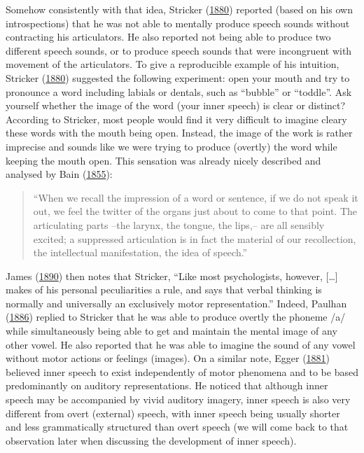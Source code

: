 \documentclass[a4paper,12pt,twoside,onecolumn,openright,final,oldfontcommands]{memoir}
\begin{document}
Somehow consistently with that idea, Stricker (\protect\hyperlink{ref-stricker_studien_1880}{1880}) reported (based on his own introspections) that he was not able to mentally produce speech sounds without contracting his articulators. He also reported not being able to produce two different speech sounds, or to produce speech sounds that were incongruent with movement of the articulators. To give a reproducible example of his intuition, Stricker (\protect\hyperlink{ref-stricker_studien_1880}{1880}) suggested the following experiment: open your mouth and try to pronounce a word including labials or dentals, such as \enquote{bubble} or \enquote{toddle}. Ask yourself whether the image of the word (your inner speech) is clear or distinct? According to Stricker, most people would find it very difficult to imagine cleary these words with the mouth being open. Instead, the image of the work is rather imprecise and sounds like we were trying to produce (overtly) the word while keeping the mouth open. This sensation was already nicely described and analysed by Bain (\protect\hyperlink{ref-bain_senses_1855}{1855}):

\begin{quote}
\enquote{When we recall the impression of a word or sentence, if we do not speak it out, we feel the twitter of the organs just about to come to that point. The articulating parts --the larynx, the tongue, the lips,-- are all sensibly excited; a suppressed articulation is in fact the material of our recollection, the intellectual manifestation, the idea of speech.}
\end{quote}

James (\protect\hyperlink{ref-james_principles_1890}{1890}) then notes that Stricker, \enquote{Like most psychologists, however, {[}\ldots{]} makes of his personal peculiarities a rule, and says that verbal thinking is normally and universally an exclusively motor representation.} Indeed, Paulhan (\protect\hyperlink{ref-paulhan_langage_1886}{1886}) replied to Stricker that he was able to produce overtly the phoneme /a/ while simultaneously being able to get and maintain the mental image of any other vowel. He also reported that he was able to imagine the sound of any vowel without motor actions or feelings (images). On a similar note, Egger (\protect\hyperlink{ref-egger_parole_1881}{1881}) believed inner speech to exist independently of motor phenomena and to be based predominantly on auditory representations. He noticed that although inner speech may be accompanied by vivid auditory imagery, inner speech is also very different from overt (external) speech, with inner speech being usually shorter and less grammatically structured than overt speech (we will come back to that observation later when discussing the development of inner speech).
\end{document}

